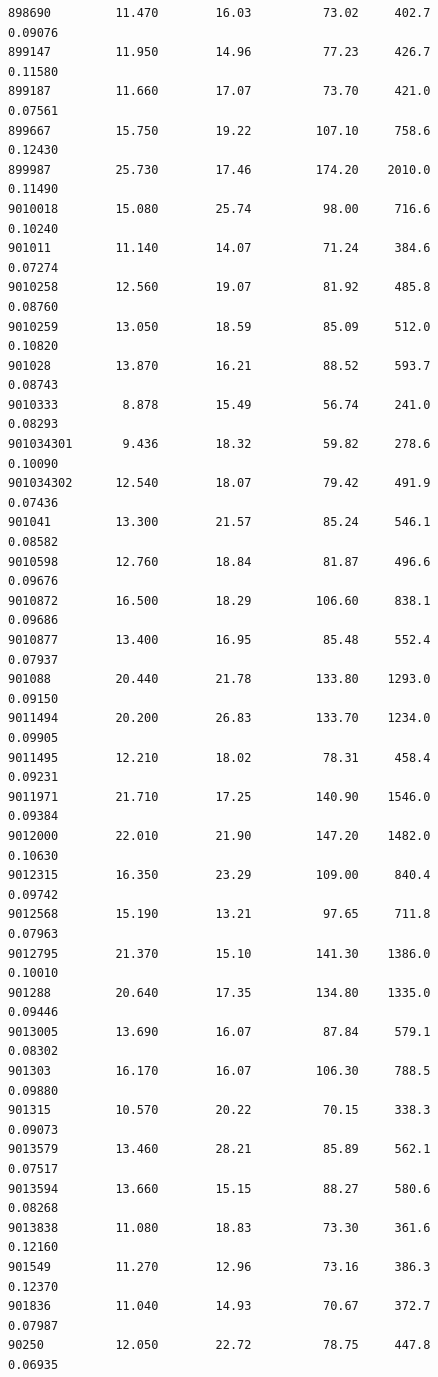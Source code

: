 \documentclass[
  letterpaper,
  DIV=11,
  numbers=noendperiod]{scrartcl}
\begin{document}
\begin{verbatim}
898690         11.470        16.03          73.02     402.7         0.09076
899147         11.950        14.96          77.23     426.7         0.11580
899187         11.660        17.07          73.70     421.0         0.07561
899667         15.750        19.22         107.10     758.6         0.12430
899987         25.730        17.46         174.20    2010.0         0.11490
9010018        15.080        25.74          98.00     716.6         0.10240
901011         11.140        14.07          71.24     384.6         0.07274
9010258        12.560        19.07          81.92     485.8         0.08760
9010259        13.050        18.59          85.09     512.0         0.10820
901028         13.870        16.21          88.52     593.7         0.08743
9010333         8.878        15.49          56.74     241.0         0.08293
901034301       9.436        18.32          59.82     278.6         0.10090
901034302      12.540        18.07          79.42     491.9         0.07436
901041         13.300        21.57          85.24     546.1         0.08582
9010598        12.760        18.84          81.87     496.6         0.09676
9010872        16.500        18.29         106.60     838.1         0.09686
9010877        13.400        16.95          85.48     552.4         0.07937
901088         20.440        21.78         133.80    1293.0         0.09150
9011494        20.200        26.83         133.70    1234.0         0.09905
9011495        12.210        18.02          78.31     458.4         0.09231
9011971        21.710        17.25         140.90    1546.0         0.09384
9012000        22.010        21.90         147.20    1482.0         0.10630
9012315        16.350        23.29         109.00     840.4         0.09742
9012568        15.190        13.21          97.65     711.8         0.07963
9012795        21.370        15.10         141.30    1386.0         0.10010
901288         20.640        17.35         134.80    1335.0         0.09446
9013005        13.690        16.07          87.84     579.1         0.08302
901303         16.170        16.07         106.30     788.5         0.09880
901315         10.570        20.22          70.15     338.3         0.09073
9013579        13.460        28.21          85.89     562.1         0.07517
9013594        13.660        15.15          88.27     580.6         0.08268
9013838        11.080        18.83          73.30     361.6         0.12160
901549         11.270        12.96          73.16     386.3         0.12370
901836         11.040        14.93          70.67     372.7         0.07987
90250          12.050        22.72          78.75     447.8         0.06935

\end{verbatim}
\end{document}

